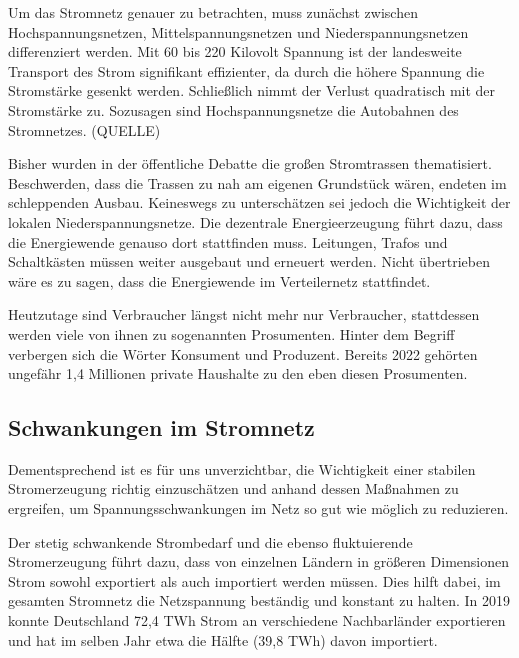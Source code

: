 \documentclass[12pt, a4paper]{article}
\begin{document}

Um das Stromnetz genauer zu betrachten, muss zunächst zwischen Hochspannungsnetzen, Mittelspannungsnetzen und Niederspannungsnetzen differenziert werden. Mit 60 bis 220 Kilovolt Spannung ist der landesweite Transport des Strom signifikant effizienter, da durch die höhere Spannung die Stromstärke gesenkt werden. Schließlich nimmt der Verlust quadratisch mit der Stromstärke zu. Sozusagen sind Hochspannungsnetze die Autobahnen des Stromnetzes. (QUELLE)

Bisher wurden in der öffentliche Debatte die großen Stromtrassen thematisiert. Beschwerden, dass die Trassen zu nah am eigenen Grundstück wären, endeten im schleppenden Ausbau. 
Keineswegs zu unterschätzen sei jedoch die Wichtigkeit der lokalen Niederspannungsnetze. Die dezentrale Energieerzeugung führt dazu, dass die Energiewende genauso dort stattfinden muss. Leitungen, Trafos und Schaltkästen müssen weiter ausgebaut und erneuert werden. Nicht übertrieben wäre es zu sagen, dass die Energiewende im Verteilernetz stattfindet.

Heutzutage sind Verbraucher längst nicht mehr nur Verbraucher, stattdessen werden viele von ihnen zu sogenannten Prosumenten. Hinter dem Begriff verbergen sich die Wörter Konsument und Produzent. Bereits 2022 gehörten ungefähr 1,4 Millionen private Haushalte zu den eben diesen Prosumenten. 




\subsection{Schwankungen im Stromnetz}

Dementsprechend ist es für uns unverzichtbar, die Wichtigkeit einer stabilen \linebreak Stromerzeugung richtig einzuschätzen und anhand dessen Maßnahmen zu ergreifen, um Spannungsschwankungen im Netz so gut wie möglich zu reduzieren.

Der stetig schwankende Strombedarf und die ebenso fluktuierende Stromerzeugung führt dazu, dass von einzelnen Ländern in größeren Dimensionen Strom sowohl exportiert als auch importiert werden müssen. Dies hilft dabei, im gesamten Stromnetz die Netzspannung beständig und konstant zu halten. In 2019 konnte Deutschland 72,4 TWh Strom an verschiedene Nachbarländer exportieren und hat im selben Jahr etwa die Hälfte (39,8 TWh) davon importiert.
\end{document}
